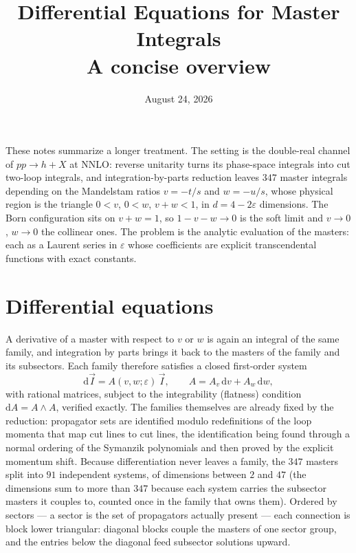 \documentclass[11pt]{article}
\title{Differential Equations for Master Integrals\\[0.4ex]
\large A concise overview}
\date{August 24, 2026}
\newcommand{\eps}{\varepsilon}
\newcommand{\dd}{\mathrm{d}}
\begin{document}
\maketitle

\noindent
These notes summarize a longer treatment.  The setting is the
double-real channel of $pp \to h + X$ at NNLO: reverse unitarity
turns its phase-space integrals into cut two-loop integrals, and
integration-by-parts reduction leaves $347$ master integrals
depending on the Mandelstam ratios $v = -t/s$ and $w = -u/s$, whose
physical region is the triangle $0<v$, $0<w$, $v+w<1$, in
$d = 4-2\eps$ dimensions.  The Born configuration sits on
$v + w = 1$, so $1-v-w \to 0$ is the soft limit and $v \to 0$,
$w \to 0$ the collinear ones.  The problem is the analytic
evaluation of the masters: each as a Laurent series in $\eps$ whose
coefficients are explicit transcendental functions with exact
constants.

\section{Differential equations}
A derivative of a master with respect to $v$ or $w$ is again an
integral of the same family, and integration by parts brings it
back to the masters of the family and its subsectors.  Each family
therefore satisfies a closed first-order system
\begin{equation}
  \dd \vec I = A(v,w;\eps)\,\vec I,
  \qquad A = A_v\,\dd v + A_w\,\dd w ,
\end{equation}
with rational matrices, subject to the integrability (flatness)
condition $\dd A = A\wedge A$, verified exactly.  The families
themselves are already fixed by the reduction: propagator sets are
identified modulo redefinitions of the loop momenta that map cut
lines to cut lines, the identification being found through a normal
ordering of the Symanzik polynomials and then proved by the explicit
momentum shift.  Because differentiation never leaves a family, the
$347$ masters split into $91$ independent systems, of dimensions
between $2$ and $47$ (the dimensions sum to more than $347$ because
each system carries the subsector masters it couples to, counted
once in the family that owns them).  Ordered by sectors ---
a sector is the set of propagators actually present --- each
connection is block lower triangular: diagonal blocks couple the
masters of one sector group, and the entries below the diagonal
feed subsector solutions upward.
\end{document}
